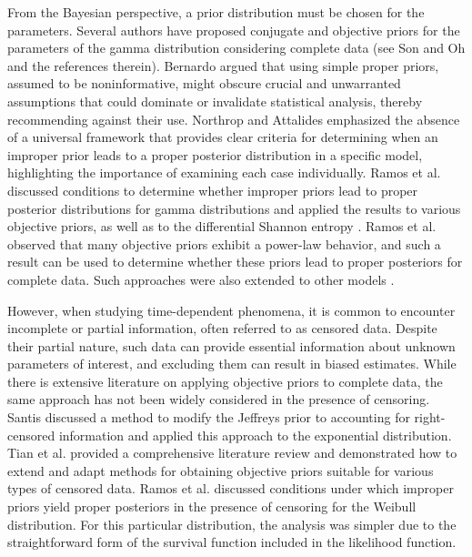 \documentclass[]{interact}
\theoremstyle{plain}%
\theoremstyle{definition}
\theoremstyle{remark}
\begin{document}
From the Bayesian perspective, a prior distribution must be chosen for the parameters. Several authors have proposed conjugate and objective priors for the parameters of the gamma distribution considering complete data (see Son and Oh \cite{son2006bayesian} and the references therein). Bernardo \cite{bernardo2005} argued that using simple proper priors, assumed to be noninformative, might obscure crucial and unwarranted assumptions that could dominate or invalidate statistical analysis, thereby recommending against their use. Northrop and Attalides \cite{northrop2016} emphasized the absence of a universal framework that provides clear criteria for determining when an improper prior leads to a proper posterior distribution in a specific model, highlighting the importance of examining each case individually. Ramos et al. \cite{ramos2021posterior} discussed conditions to determine whether improper priors lead to proper posterior distributions for gamma distributions and applied the results to various objective priors, as well as to the differential Shannon entropy \cite{ramos2024entropy}. Ramos et al. \cite{ramos2020power} observed that many objective priors exhibit a power-law behavior, and such a result can be used to determine whether these priors lead to proper posteriors for complete data. Such approaches were also extended to other models \cite{achire2024posterior, ramos2021bayesian}.


However, when studying time-dependent phenomena, it is common to encounter incomplete or partial information, often referred to as censored data. Despite their partial nature, such data can provide essential information about unknown parameters of interest, and excluding them can result in biased estimates. While there is extensive literature on applying objective priors to complete data, the same approach has not been widely considered in the presence of censoring. Santis \cite{de2001jeffreys} discussed a method to modify the Jeffreys prior to accounting for right-censored information and applied this approach to the exponential distribution. Tian et al. \cite{tian2022specifying} provided a comprehensive literature review and demonstrated how to extend and adapt methods for obtaining objective priors suitable for various types of censored data. Ramos et al. \cite{ramos2020posterior} discussed conditions under which improper priors yield proper posteriors in the presence of censoring for the Weibull distribution. For this particular distribution, the analysis was simpler due to the straightforward form of the survival function included in the likelihood function.
\end{document}
